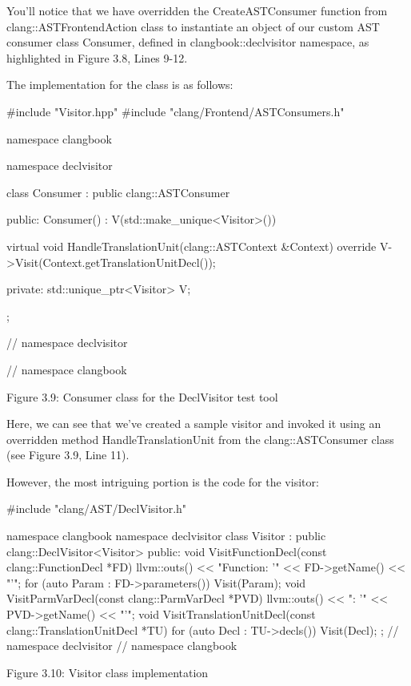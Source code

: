 You'll notice that we have overridden the CreateASTConsumer function from clang::ASTFrontendAction class to instantiate an object of our custom AST consumer class Consumer, defined in clangbook::declvisitor namespace, as highlighted in Figure 3.8, Lines 9-12.

The implementation for the class is as follows:

\begin{cpp}
#include "Visitor.hpp"
#include "clang/Frontend/ASTConsumers.h"

namespace clangbook {
namespace declvisitor {
class Consumer : public clang::ASTConsumer {
public:
  Consumer() : V(std::make_unique<Visitor>()) {}

  virtual void HandleTranslationUnit(clang::ASTContext &Context) override {
    V->Visit(Context.getTranslationUnitDecl());
  }

private:
  std::unique_ptr<Visitor> V;
};
} // namespace declvisitor
} // namespace clangbook
\end{cpp}

\begin{center}
Figure 3.9: Consumer class for the DeclVisitor test tool
\end{center}

Here, we can see that we've created a sample visitor and invoked it using an overridden method HandleTranslationUnit from the clang::ASTConsumer class (see Figure 3.9, Line 11).

However, the most intriguing portion is the code for the visitor:

\begin{cpp}
#include "clang/AST/DeclVisitor.h"

namespace clangbook {
namespace declvisitor {
class Visitor : public clang::DeclVisitor<Visitor> {
public:
  void VisitFunctionDecl(const clang::FunctionDecl *FD) {
    llvm::outs() << "Function: '" << FD->getName() << "'\n";
    for (auto Param : FD->parameters()) {
      Visit(Param);
    }
  }
  void VisitParmVarDecl(const clang::ParmVarDecl *PVD) {
    llvm::outs() << "\tParameter: '" << PVD->getName() << "'\n";
  }
  void VisitTranslationUnitDecl(const clang::TranslationUnitDecl *TU) {
    for (auto Decl : TU->decls()) {
      Visit(Decl);
    }
  }
};
} // namespace declvisitor
} // namespace clangbook
\end{cpp}

\begin{center}
Figure 3.10: Visitor class implementation
\end{center}

